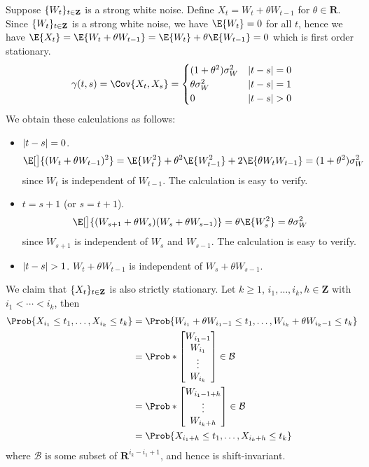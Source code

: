 \begin{Example}{}{}
    Suppose $ \{W_t\}_{t\in\mathbf{Z}} $ is a strong white noise.
    Define $ X_t=W_t+\theta W_{t-1} $ for $ \theta\in\mathbf{R} $.
    Since $ \{W_t\}_{t\in\mathbf{Z}} $ is a strong white noise, we
    have $ \E{W_t}=0 $ for all $ t $, hence we
    have $ \E{X_t}=\E{W_t+\theta W_{t-1}}=\E{W_t}+\theta\E{W_{t-1}}=0 $
    which is first order stationary.
    \[ \gamma(t,s)=\Cov{X_t,X_s}=\begin{cases}
            (1+\theta^2)\sigma_W^2 & \abs{t-s}=0 \\
            \theta\sigma_W^2       & \abs{t-s}=1 \\
            0                      & \abs{t-s}>0
        \end{cases} \]
    We obtain these calculations as follows:
    \begin{itemize}
        \item $ \lvert t-s\rvert=0 $.
              \[ \E[\big]{(W_t+\theta W_{t-1})^2}
                  =\E{W_t^2}+\theta^2\E{W_{t-1}^2}+2\E{\theta W_t W_{t-1}}
                  =(1+\theta^2)\sigma_W^2 \]
              since $ W_t $ is independent of $ W_{t-1} $. The calculation is easy to verify.
        \item $ t=s+1 $ (or $ s=t+1 $).
              \[ \E[\big]{(W_{s+1}+\theta W_s)(W_s+\theta W_{s-1})}=\theta\E{W_s^2}=\theta\sigma_W^2 \]
              since $ W_{s+1} $ is independent of $ W_s $ and $ W_{s-1} $.
              The calculation is easy to verify.
        \item $ \lvert t-s\rvert>1 $. $ W_t+\theta W_{t-1} $ is independent of
              $ W_s+\theta W_{s-1} $.
    \end{itemize}
    We claim that $ \{X_t\}_{t\in\mathbf{Z}} $ is also strictly stationary.
    Let $ k\ge 1 $, $ i_1,\ldots,i_k, h\in\mathbf{Z} $
    with $ i_1<\cdots<i_k $, then
    \begin{align*}
        \Prob{X_{i_1}\le t_1,\ldots,X_{i_k}\le t_k}
         & =\Prob{W_{i_1}+\theta W_{{i_1}-1}\le t_1,\ldots,W_{i_k}+\theta W_{{i_k}-1}\le t_k} \\
         & =\Prob*{\begin{bmatrix}
                W_{{i_1}-1} \\
                W_{i_1}     \\
                \vdots      \\
                W_{i_k}
            \end{bmatrix}\in \mathcal{B}}                                 \\
         & =\Prob*{\begin{bmatrix}
                W_{{i_1-1}+h} \\
                \vdots        \\
                W_{{i_k}+h}
            \end{bmatrix}\in \mathcal{B}}                                 \\
         & =\Prob{X_{{i_1}+h}\le t_1,\ldots,X_{{i_k}+h}\le t_k}
    \end{align*}
    where $ \mathcal{B} $ is some subset of $ \mathbf{R}^{i_k-i_1+1} $, and hence
    is shift-invariant.
\end{Example}
